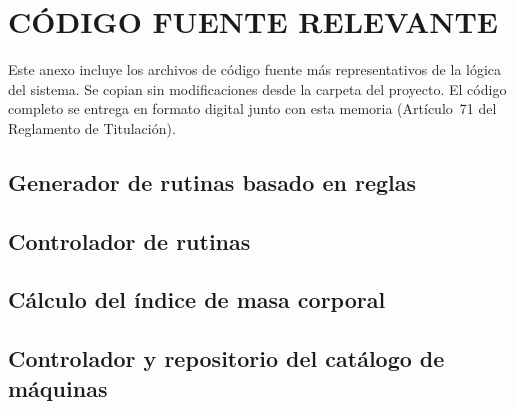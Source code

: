 \chapter{CÓDIGO FUENTE RELEVANTE}
\label{anx:codigo}

Este anexo incluye los archivos de código fuente más representativos de la
lógica del sistema. Se copian sin modificaciones desde la carpeta
 del proyecto. El código completo se entrega en formato digital
junto con esta memoria (Artículo~71 del Reglamento de Titulación).

\section{Generador de rutinas basado en reglas}



\section{Controlador de rutinas}



\section{Cálculo del índice de masa corporal}



\section{Controlador y repositorio del catálogo de máquinas}





